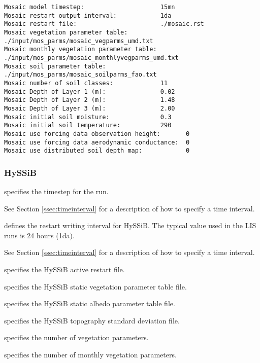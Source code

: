  \begin{Verbatim}[frame=single]
Mosaic model timestep:                     15mn
Mosaic restart output interval:            1da
Mosaic restart file:                       ./mosaic.rst
Mosaic vegetation parameter table:         ./input/mos_parms/mosaic_vegparms_umd.txt
Mosaic monthly vegetation parameter table: ./input/mos_parms/mosaic_monthlyvegparms_umd.txt
Mosaic soil parameter table:               ./input/mos_parms/mosaic_soilparms_fao.txt
Mosaic number of soil classes:             11
Mosaic Depth of Layer 1 (m):               0.02
Mosaic Depth of Layer 2 (m):               1.48
Mosaic Depth of Layer 3 (m):               2.00
Mosaic initial soil moisture:              0.3
Mosaic initial soil temperature:           290
Mosaic use forcing data observation height:       0
Mosaic use forcing data aerodynamic conductance:  0
Mosaic use distributed soil depth map:            0
 \end{Verbatim}

 
 \subsubsection{HySSiB} \label{sssec:lsm_hyssib}
 

 
  specifies the timestep for the run.

 See Section \ref{ssec:timeinterval} for a description
 of how to specify a time interval.

  defines the restart
 writing interval for HySSiB. The typical value used in the
 LIS runs is 24 hours (1da).

 See Section \ref{ssec:timeinterval} for a description
 of how to specify a time interval.

  specifies the HySSiB active restart file.

  specifies the HySSiB static
 vegetation parameter table file.

  specifies the HySSiB static
 albedo parameter table file.

  specifies the HySSiB topography
 standard deviation file.

  specifies the
 number of vegetation parameters.

  specifies the
 number of monthly vegetation parameters.


